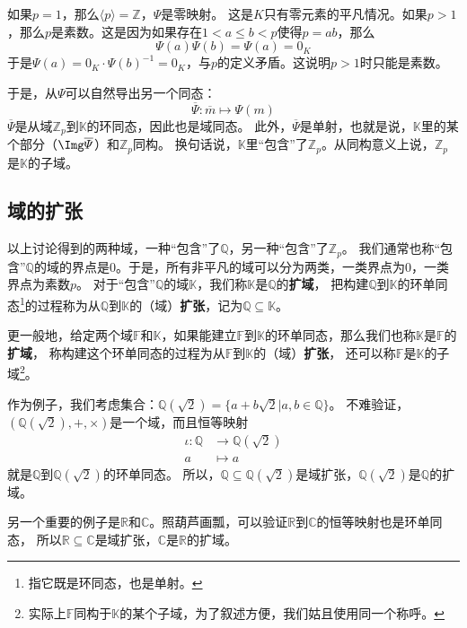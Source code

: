 \documentclass[12pt,UTF8]{ctexbook}
\begin{document}
\begin{appendix}
如果$p=1$，那么$\langle p \rangle = \mathbb{Z}$，$\varPsi$是零映射。
这是$K$只有零元素的平凡情况。如果$p>1$，那么$p$是素数。这是因为如果存在$1 < a \leqslant b < p$使得$p = ab$，那么
$$ \varPsi(a) \varPsi(b) = \varPsi(a) = 0_{K}$$
于是$\varPsi(a) = 0_{K}\cdot \varPsi(b)^{-1} = 0_{K}$，与$p$的定义矛盾。这说明$p>1$时只能是素数。

于是，从$\varPsi$可以自然导出另一个同态：
$$ \overline{\varPsi}: \overline{m} \mapsto \varPsi(m)  $$
$\overline{\varPsi}$是从域$\mathbb{Z}_p$到$\mathbb{K}$的环同态，因此也是域同态。
此外，$\overline{\varPsi}$是单射，也就是说，$\mathbb{K}$里的某个部分（$\Img \overline{\varPsi}$）和$\mathbb{Z}_p$同构。
换句话说，$\mathbb{K}$里“包含”了$\mathbb{Z}_p$。从同构意义上说，$\mathbb{Z}_p$是$\mathbb{K}$的子域。

\subsection{域的扩张}
以上讨论得到的两种域，一种“包含”了$\mathbb{Q}$，另一种“包含”了$\mathbb{Z}_p$。
我们通常也称“包含”$\mathbb{Q}$的域的界点是$0$。于是，所有非平凡的域可以分为两类，一类界点为$0$，一类界点为素数$p$。
对于“包含”$\mathbb{Q}$的域$\mathbb{K}$，我们称$\mathbb{K}$是$\mathbb{Q}$的\textbf{扩域}，
把构建$\mathbb{Q}$到$\mathbb{K}$的环单同态\footnote{指它既是环同态，也是单射。}的过程称为从$\mathbb{Q}$到$\mathbb{K}$的（域）\textbf{扩张}，记为$\mathbb{Q} \subseteq \mathbb{K}$。

更一般地，给定两个域$\mathbb{F}$和$\mathbb{K}$，如果能建立$\mathbb{F}$到$\mathbb{K}$的环单同态，那么我们也称$\mathbb{K}$是$\mathbb{F}$的\textbf{扩域}，
称构建这个环单同态的过程为从$\mathbb{F}$到$\mathbb{K}$的（域）\textbf{扩张}，
还可以称$\mathbb{F}$是$\mathbb{K}$的子域\footnote{实际上$\mathbb{F}$同构于$\mathbb{K}$的某个子域，为了叙述方便，我们姑且使用同一个称呼。}。

作为例子，我们考虑集合：$\mathbb{Q}(\sqrt{2}) = \{a + b\sqrt{2} | a, b \in \mathbb{Q}\}$。
不难验证，$(\mathbb{Q}(\sqrt{2}), +, \times)$是一个域，而且恒等映射
\begin{align*}
    \iota: \mathbb{Q} &\rightarrow \mathbb{Q}(\sqrt{2})  \\
    a &\mapsto a  
\end{align*}
就是$\mathbb{Q}$到$\mathbb{Q}(\sqrt{2})$的环单同态。
所以，$\mathbb{Q} \subseteq \mathbb{Q}(\sqrt{2})$是域扩张，$\mathbb{Q}(\sqrt{2})$是$\mathbb{Q}$的扩域。

另一个重要的例子是$\mathbb{R}$和$\mathbb{C}$。照葫芦画瓢，可以验证$\mathbb{R}$到$\mathbb{C}$的恒等映射也是环单同态，
所以$\mathbb{R} \subseteq \mathbb{C}$是域扩张，$\mathbb{C}$是$\mathbb{R}$的扩域。


\end{appendix}
\end{document}
